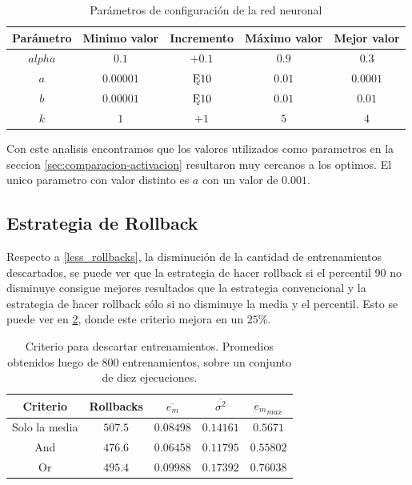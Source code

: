 \documentclass[a4paper,10pt]{article}
\begin{document}
        \begin{table}[H]
            \begin{tabular}{|c|c|c|c|c|}
                \hline
                Parámetro & Minimo valor & Incremento & Máximo valor & Mejor valor \\ \hline
                $alpha$ & $0.1$ & $+ 0.1$ & $0.9$ & $0.3$ \\ \hline
                $a$ & $0.00001$ & $\Cross 10$ & $0.01$ & $0.0001$ \\ \hline
                $b$ & $0.00001$ & $\Cross 10$ & $0.01$ & $0.01$ \\ \hline
                $k$ & $1$ & $+ 1$ & $5$ & $4$ \\ \hline
            \end{tabular}
            \caption{Parámetros de configuración de la red neuronal}
            \label{tabla_configuracion}
        \end{table}

        Con este analisis encontramos que los valores utilizados como parametros en la seccion \ref{sec:comparacion-activacion} resultaron muy cercanos a los optimos.
        El unico parametro con valor distinto es $a$ con un valor de $0.001$.

    \subsection{Estrategia de Rollback}

        Respecto a \ref{less_rollbacks}, la disminución de la cantidad de entrenamientos descartados, se puede ver que la estrategia de hacer rollback si el percentil 90 no disminuye consigue mejores resultados que la estrategia convencional y la estrategia de hacer rollback sólo si no disminuye la media y el percentil. Esto se puede ver en \ref{tabla_rollbacks}, donde este criterio mejora en un $25\%$.

    \begin{table}[H]
        \begin{tabular}{|c|c|c|c|c|}
        \hline
        Criterio & Rollbacks & $\overline{e_m}$ & $\overline{\sigma^2}$ & ${e_m}_{max} $ \\ \hline
        Solo la media & $507.5$ & $0.08498$ & $0.14161$ & $0.5671$ \\ \hline
        And & $476.6$ & $0.06458$ & $0.11795$ & $0.55802$ \\ \hline
        Or & $495.4$ & $0.09988$ & $0.17392$ & $0.76038$ \\ \hline
        \end{tabular}
        \caption{Criterio para descartar entrenamientos. Promedios obtenidos luego de 800 entrenamientos, sobre un conjunto de diez ejecuciones.}
        \label{tabla_rollbacks}
    \end{table}
\end{document}
